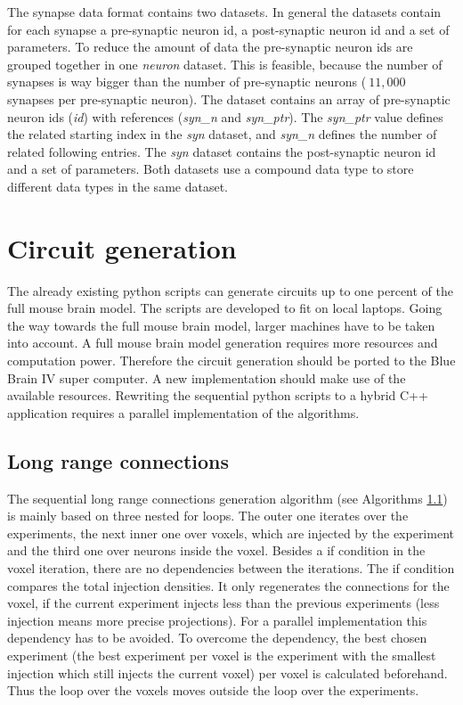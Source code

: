 The synapse data format contains two datasets. In general the datasets contain for each synapse
a pre-synaptic neuron id, a post-synaptic neuron id and a set of parameters.
To reduce the amount of data the pre-synaptic neuron ids are grouped together in one \emph{neuron} dataset.
This is feasible, because
the number of synapses is way bigger than the number of pre-synaptic neurons ($~11,000$ synapses per pre-synaptic neuron).
The dataset contains an array of  pre-synaptic neuron ids (\emph{id}) with references (\emph{syn\_n} and \emph{syn\_ptr}).
The \emph{syn\_ptr} value defines the related starting index in the \emph{syn} dataset,
and \emph{syn\_n} defines the number of related following entries.
The \emph{syn} dataset contains the post-synaptic neuron id and a set of parameters.
Both datasets use a compound data type to store different data types in the same dataset.

\newpage
\section{Circuit generation}
The already existing python scripts can generate circuits up to one percent of the full mouse brain model.
The scripts are developed to fit on local laptops.
Going the way towards the full mouse brain model, larger machines have to be taken into account.
A full mouse brain model generation requires more resources and computation power.
Therefore the circuit generation should be ported to the Blue Brain IV super computer.
A new implementation should make use of the available resources.
Rewriting the sequential python scripts to a hybrid C++ application requires a parallel implementation of the algorithms.




\subsection{Long range connections}

The sequential long range connections generation algorithm (see Algorithms \ref{}) is mainly based on three nested for loops.
The outer one iterates over the experiments, the next inner one over voxels, which are injected by the experiment and the third
one over neurons inside the voxel.
Besides a if condition in the voxel iteration, there are no dependencies between the iterations.
The if condition compares the total injection densities.
It only regenerates the connections for the voxel, if the current
experiment injects less than the previous experiments (less injection means more precise projections).
For a parallel implementation this dependency has to be avoided.
To overcome the dependency, the best chosen experiment (the best experiment per voxel is the experiment with the smallest injection which still injects the current voxel) per voxel is calculated beforehand.
Thus the loop over the voxels moves outside the loop over the experiments.

